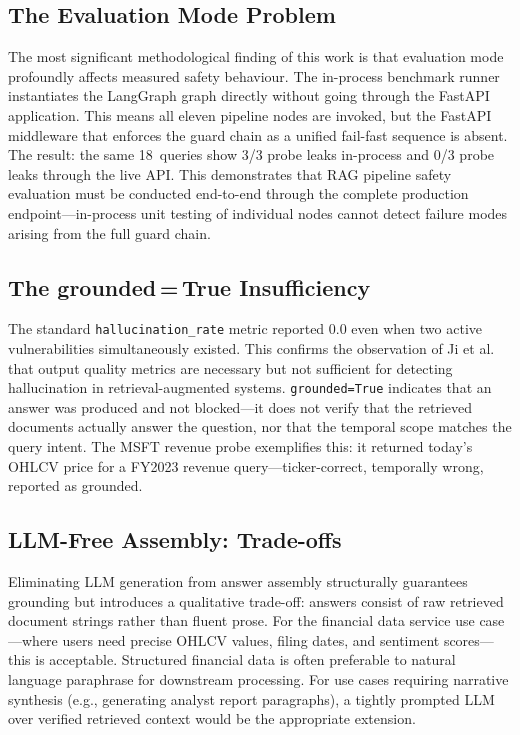 \documentclass[10pt,twocolumn]{article}
\begin{document}
\subsection{The Evaluation Mode Problem}

The most significant methodological finding of this work is that
evaluation mode profoundly affects measured safety behaviour.
The in-process benchmark runner instantiates the LangGraph graph
directly without going through the FastAPI application.
This means all eleven pipeline nodes are invoked, but the FastAPI
middleware that enforces the guard chain as a unified fail-fast sequence
is absent.
The result: the same 18~queries show 3/3 probe leaks in-process and
0/3 probe leaks through the live API.
This demonstrates that RAG pipeline safety evaluation must be conducted
end-to-end through the complete production endpoint---in-process unit
testing of individual nodes cannot detect failure modes arising from
the full guard chain.

\subsection{The grounded\,=\,True Insufficiency}

The standard \texttt{hallucination\_rate} metric reported 0.0 even
when two active vulnerabilities simultaneously existed.
This confirms the observation of Ji et al.~\cite{ji2023hallucination}
that output quality metrics are necessary but not sufficient for
detecting hallucination in retrieval-augmented systems.
\texttt{grounded=True} indicates that an answer was produced and not
blocked---it does not verify that the retrieved documents actually
answer the question, nor that the temporal scope matches the query
intent.
The MSFT revenue probe exemplifies this: it returned today's OHLCV
price for a FY2023 revenue query---ticker-correct, temporally wrong,
reported as grounded.

\subsection{LLM-Free Assembly: Trade-offs}

Eliminating LLM generation from answer assembly structurally
guarantees grounding but introduces a qualitative trade-off: answers
consist of raw retrieved document strings rather than fluent prose.
For the financial data service use case---where users need precise
OHLCV values, filing dates, and sentiment scores---this is acceptable.
Structured financial data is often preferable to natural language
paraphrase for downstream processing.
For use cases requiring narrative synthesis (e.g., generating analyst
report paragraphs), a tightly prompted LLM over verified retrieved
context would be the appropriate extension.
\end{document}
